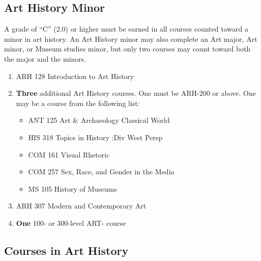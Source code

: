 \documentclass[
  letterpaper,
]{scrbook}
\providecommand{\tightlist}{%
  \setlength{\itemsep}{0pt}\setlength{\parskip}{0pt}}
\begin{document}
\subsection{Art History Minor}\label{art-history-minor}

A grade of ``C'' (2.0) or higher must be earned in all courses counted
toward a minor in art history. An Art History minor may also complete an
Art major, Art minor, or Museum studies minor, but only two courses may
count toward both the major and the minors.

\begin{enumerate}
\def\labelenumi{\arabic{enumi}.}
\item
  ARH 128 Introduction to Art History\\
\item
  \textbf{Three} additional Art History courses. One must be ARH-200 or
  above. One may be a course from the following list:

  \begin{itemize}
  \tightlist
  \item
    ANT 125 Art \& Archaeology Classical World\\
  \item
    HIS 318 Topics in History :Div West Persp\\
  \item
    COM 161 Visual Rhetoric\\
  \item
    COM 257 Sex, Race, and Gender in the Media\\
  \item
    MS 105 History of Museums\\
  \end{itemize}
\item
  ARH 307 Modern and Contemporary Art\\
\item
  \textbf{One} 100- or 300-level ART- course
\end{enumerate}

\subsection{Courses in Art History}\label{courses-in-art-history}
\end{document}

